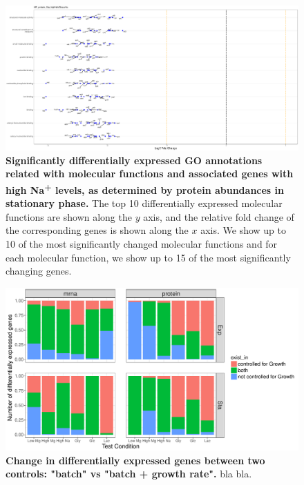 \documentclass[a4paper]{article}
\begin{document}
\begin{figure}[!htb]
	\includegraphics[width=1.0\textwidth]{../../d_figures/MF16_protein_Sta_highNaVSbaseNa_withTitle.pdf}
	\caption[Significantly differentially expressed GO annotations associated with molecular functions for protein samples in stationary phase tested for high Na\textsuperscript{+} levels against base Na\textsuperscript{+} levels]
	{\textbf{Significantly differentially expressed GO annotations related with molecular functions and associated genes with high Na\textsuperscript{+} levels, as determined by protein abundances in stationary phase.} The top 10 differentially expressed molecular functions are shown along the $y$ axis, and the relative fold change of the corresponding genes is shown along the $x$ axis. We show up to 10 of the most significantly changed molecular functions and for each molecular function, we show up to 15 of the most significantly changing genes.}
\end{figure}





\clearpage
\begin{figure}[!htb]
	\includegraphics[width=1\textwidth]{../../c_figures/difference_rtw_GrowthControl.pdf}
	\caption[Change in differentially expressed genes between two controls: "batch" vs "batch + growth rate"]
	{\textbf{Change in differentially expressed genes between two controls: "batch" vs "batch + growth rate".} bla bla.}
\end{figure}
\end{document}
